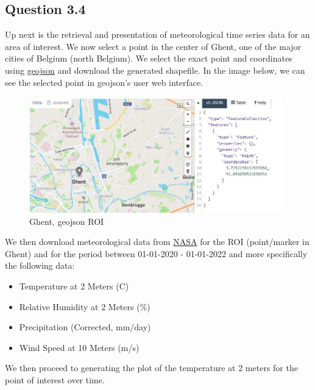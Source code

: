 \subsection{Question 3.4}
Up next is the retrieval and presentation of meteorological time series data for an area of interest. We now select a point in the center of Ghent, one of the major cities of Belgium (north Belgium). We select the exact point and coordinates using \href{https://geojson.io/}{geojson} and download the generated shapefile. In the image below, we can see the selected point in geojson's user web interface.

\begin{figure}[h]
    \centering
    \includegraphics[width=11cm]{figures/q3_4_ghent_geojson_point.JPG}
    \caption{Ghent, geojson ROI}
    \label{fig:Ghent, geojson ROI}
\end{figure}
\FloatBarrier %

We then download meteorological data from \href{https://power.larc.nasa.gov/data-access-viewer/}{NASA}  for the ROI (point/marker in Ghent) and for the period between 01-01-2020 - 01-01-2022 and more specifically the following data:

\begin{itemize}
    \item Temperature at 2 Meters (C)
    \item Relative Humidity at 2 Meters (\%)
    \item Precipitation (Corrected, mm/day)
    \item Wind Speed at 10 Meters (m/s)
\end{itemize}

We then proceed to generating the plot of the temperature at 2 meters for the point of interest over time.

